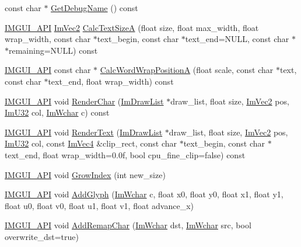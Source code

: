 \begin{DoxyCompactItemize}
\item 
const char $\ast$ \mbox{\hyperlink{struct_im_font_a11843ed46aaa122264d0da87ffafd627}{Get\+Debug\+Name}} () const
\item 
\mbox{\hyperlink{imgui_8h_a43829975e84e45d1149597467a14bbf5}{I\+M\+G\+U\+I\+\_\+\+A\+PI}} \mbox{\hyperlink{struct_im_vec2}{Im\+Vec2}} \mbox{\hyperlink{struct_im_font_ad67f64fd206ad197f4b93b1a1ae27cfe}{Calc\+Text\+SizeA}} (float size, float max\+\_\+width, float wrap\+\_\+width, const char $\ast$text\+\_\+begin, const char $\ast$text\+\_\+end=N\+U\+LL, const char $\ast$$\ast$remaining=N\+U\+LL) const
\item 
\mbox{\hyperlink{imgui_8h_a43829975e84e45d1149597467a14bbf5}{I\+M\+G\+U\+I\+\_\+\+A\+PI}} const char $\ast$ \mbox{\hyperlink{struct_im_font_a3781bb82a1ceba919cb6c98a398c7a67}{Calc\+Word\+Wrap\+PositionA}} (float scale, const char $\ast$text, const char $\ast$text\+\_\+end, float wrap\+\_\+width) const
\item 
\mbox{\hyperlink{imgui_8h_a43829975e84e45d1149597467a14bbf5}{I\+M\+G\+U\+I\+\_\+\+A\+PI}} void \mbox{\hyperlink{struct_im_font_aa8370ddcf8d3e4e034d07de9e00fcdd1}{Render\+Char}} (\mbox{\hyperlink{struct_im_draw_list}{Im\+Draw\+List}} $\ast$draw\+\_\+list, float size, \mbox{\hyperlink{struct_im_vec2}{Im\+Vec2}} pos, \mbox{\hyperlink{imgui_8h_a118cff4eeb8d00e7d07ce3d6460eed36}{Im\+U32}} col, \mbox{\hyperlink{imgui_8h_af2c7badaf05a0008e15ef76d40875e97}{Im\+Wchar}} c) const
\item 
\mbox{\hyperlink{imgui_8h_a43829975e84e45d1149597467a14bbf5}{I\+M\+G\+U\+I\+\_\+\+A\+PI}} void \mbox{\hyperlink{struct_im_font_a2877acf1cfcd964bc2e7fe600a08849e}{Render\+Text}} (\mbox{\hyperlink{struct_im_draw_list}{Im\+Draw\+List}} $\ast$draw\+\_\+list, float size, \mbox{\hyperlink{struct_im_vec2}{Im\+Vec2}} pos, \mbox{\hyperlink{imgui_8h_a118cff4eeb8d00e7d07ce3d6460eed36}{Im\+U32}} col, const \mbox{\hyperlink{struct_im_vec4}{Im\+Vec4}} \&clip\+\_\+rect, const char $\ast$text\+\_\+begin, const char $\ast$text\+\_\+end, float wrap\+\_\+width=0.\+0f, bool cpu\+\_\+fine\+\_\+clip=false) const
\item 
\mbox{\hyperlink{imgui_8h_a43829975e84e45d1149597467a14bbf5}{I\+M\+G\+U\+I\+\_\+\+A\+PI}} void \mbox{\hyperlink{struct_im_font_ab7865a365d9653b4636b198d2f222fd6}{Grow\+Index}} (int new\+\_\+size)
\item 
\mbox{\hyperlink{imgui_8h_a43829975e84e45d1149597467a14bbf5}{I\+M\+G\+U\+I\+\_\+\+A\+PI}} void \mbox{\hyperlink{struct_im_font_ae63d3d343052336d7718aacac8f394b7}{Add\+Glyph}} (\mbox{\hyperlink{imgui_8h_af2c7badaf05a0008e15ef76d40875e97}{Im\+Wchar}} c, float x0, float y0, float x1, float y1, float u0, float v0, float u1, float v1, float advance\+\_\+x)
\item 
\mbox{\hyperlink{imgui_8h_a43829975e84e45d1149597467a14bbf5}{I\+M\+G\+U\+I\+\_\+\+A\+PI}} void \mbox{\hyperlink{struct_im_font_aba8cd20f14ba47175d45d3f2063aa329}{Add\+Remap\+Char}} (\mbox{\hyperlink{imgui_8h_af2c7badaf05a0008e15ef76d40875e97}{Im\+Wchar}} dst, \mbox{\hyperlink{imgui_8h_af2c7badaf05a0008e15ef76d40875e97}{Im\+Wchar}} src, bool overwrite\+\_\+dst=true)
\end{DoxyCompactItemize}

